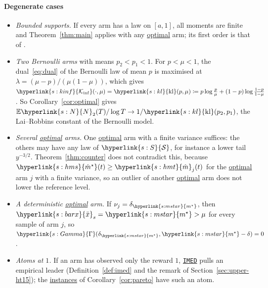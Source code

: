 \documentclass[11pt]{article}
\newcommand{\E}{\mathbb{E}}
\newcommand{\dt}[1]{\hypertarget{#1}{}}
\newcommand{\sy}[2]{{\hyperlink{#1}{#2}}}
\newcommand{\term}[2]{\hyperlink{#1}{#2}}
\newcommand{\imed}{\hyperref[alg:imed]{\texttt{IMED}}}
\newcommand{\Sm}{\sy{s:S}{\mathcal{S}}}
\newcommand{\ms}{\sy{s:mstar}{m^{\star}}}
\newcommand{\Kinf}{\sy{s:kinf}{\mathcal{K}_{\inf}}}
\newcommand{\bx}{\sy{s:barx}{\bar{x}}}
\newcommand{\Np}{\sy{s:N}{N}}
\newcommand{\hmt}{\sy{s:hmt}{\hat{m}}}
\newcommand{\hms}{\sy{s:hms}{\hat{m}^{\star}}}
\newcommand{\Gam}{\sy{s:Gamma}{\Gamma}}
\newcommand{\kl}{\sy{s:kl}{\mathrm{kl}}}
\begin{document}
\paragraph{Degenerate cases}
\begin{itemize}[leftmargin=*]
\item \emph{Bounded supports.} If every arm has a law on $[a,1]$, all moments are finite and
  Theorem~\ref{thm:main} applies with any \term{w:optimal}{optimal} arm; its first order is that of
  \citet[Corollary~4]{HT15}.
\item \emph{Two Bernoulli arms} with means $p_2<p_1<1$. For $p<\mu<1$, the dual~\eqref{eq:dual} of
  the Bernoulli law of mean $p$ is maximised at $\lambda=(\mu-p)/(\mu(1-\mu))$, which gives
  \dt{s:kl}$\Kinf(\cdot,\mu)=\kl(p,\mu)\coloneqq p\log\frac p\mu+(1-p)\log\frac{1-p}{1-\mu}$. So
  Corollary~\ref{cor:optimal} gives $\E \Np_2(T)/\log T\to1/\kl(p_2,p_1)$, the Lai--Robbins constant
  of the Bernoulli model.
\item \emph{Several \term{w:optimal}{optimal} arms.} One \term{w:optimal}{optimal} arm with a finite variance suffices: the others may
  have any law of $\Sm$, for instance a lower tail $y^{-3/2}$. Theorem~\ref{thm:counter} does not
  contradict this, because $\hms(t)\ge\hmt_j(t)$ for the \term{w:optimal}{optimal} arm $j$ with a finite
  variance, so an outlier of another \term{w:optimal}{optimal} arm does not lower the reference level.
\item \emph{A deterministic \term{w:optimal}{optimal} arm.} If $\nu_j=\delta_{\ms}$, then $\bx_s=\ms>\mu$ for every
  sample of arm $j$, so $\Gam(\delta_{\ms},\ms-\delta)=0$.
\item \emph{Atoms at $1$.} If an arm has observed only the reward $1$, \imed{} pulls an empirical
  leader (Definition~\ref{def:imed} and the remark of Section~\ref{sec:upper-ht15}); the \term{w:instance}{instances} of
  Corollary~\ref{cor:pareto} have such an atom.
\end{itemize}
\end{document}
